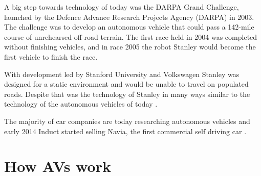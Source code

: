 \documentclass[11pt]{article}
\begin{document}
A big step towards technology of today was the DARPA Grand Challenge, launched by the Defence Advance Research Projects Agency (DARPA) in 2003. The challenge was to develop an autonomous vehicle that could pass a 142-mile course of unrehearsed off-road terrain. The first race held in 2004 was completed without finishing vehicles, and in race 2005 the robot Stanley would become the first vehicle to finish the race.

With development led by Stanford University and Volkswagen Stanley was designed for a static environment and would be unable to travel on populated roads. Despite that was the technology of Stanley in many ways similar to the technology of the autonomous vehicles of today \cite{Thrun2006stanley}.

The majority of car companies are today researching autonomous vehicles and early 2014 Induct started selling Navia, the first commercial self driving car \cite{Maisto2014Navia}.


\section{How AVs work}
\end{document}
